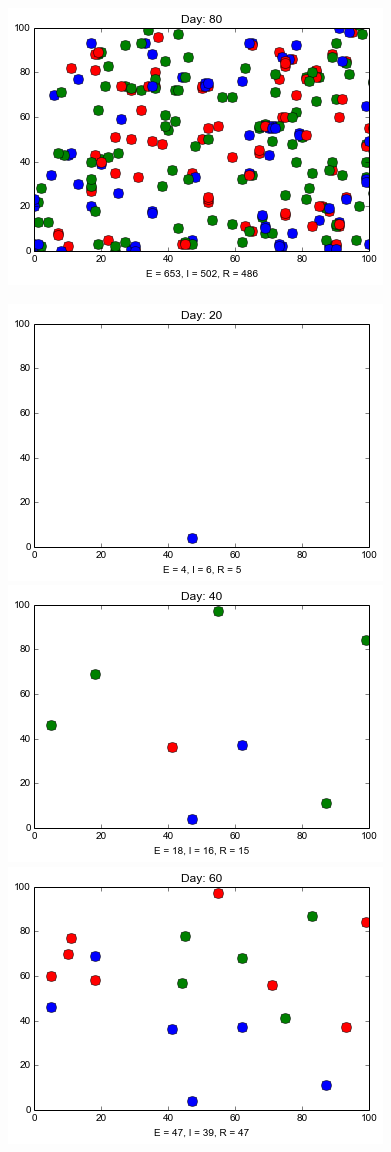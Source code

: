 \begin{minipage}{\linewidth}
\includegraphics[scale=0.28]{images/3t80.png} 

\medskip
\includegraphics[scale=0.28]{images/2t20.png} \quad
\includegraphics[scale=0.28]{images/2t40.png} \quad
\includegraphics[scale=0.28]{images/2t60.png} \quad

\end{minipage}

